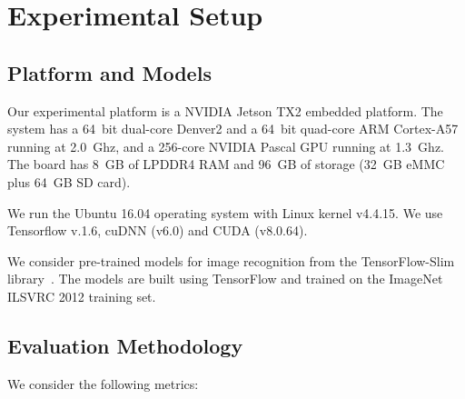\section{Experimental Setup \label{sec:setup}}
\subsection{Platform and Models\label{sec:platform}}
 Our experimental platform is a NVIDIA Jetson TX2 embedded platform. The system has a 64~bit dual-core Denver2 and a
64~bit quad-core ARM Cortex-A57 running at 2.0~Ghz, and a 256-core NVIDIA Pascal GPU running at 1.3~Ghz. The board has 8~GB of LPDDR4 RAM
and 96~GB of storage (32~GB eMMC plus 64~GB SD card).


 We run the Ubuntu 16.04 operating system with Linux kernel v4.4.15. We use Tensorflow v.1.6, cuDNN (v6.0) and
CUDA (v8.0.64).


 We consider  pre-trained \CNN models for image recognition from the TensorFlow-Slim
library~\cite{silberman2013tensorflow}. The models are built using TensorFlow and trained on the ImageNet ILSVRC 2012 training set.


\subsection{Evaluation Methodology \label{sec:method}}


 We consider the following metrics:


